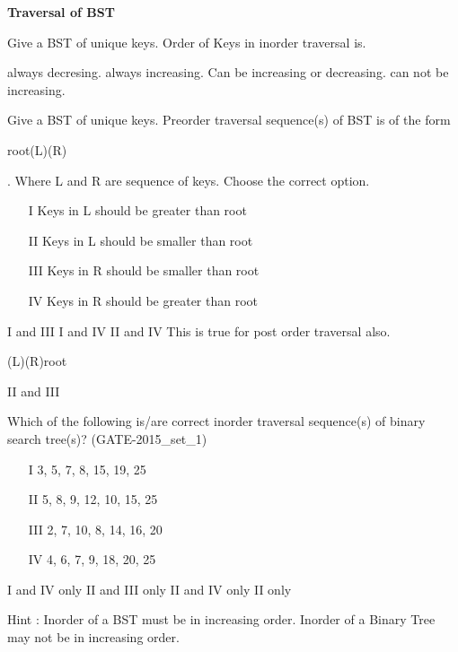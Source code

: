 

\centerline{\textbf{ \LARGE Traversal of BST}}

\begin{questyle}
  \question  Give a BST of unique keys. Order of Keys in inorder traversal is.
  \begin{choices}
    \choice         always decresing.
    \CorrectChoice  always increasing.
    \choice         Can be increasing or decreasing.
    \choice         can not be increasing.
  \end{choices}
\end{questyle}


\begin{questyle}
  \question  Give a BST of unique keys. Preorder traversal sequence(s) of BST is of the form
            \begin{hl} {root(L)(R)}\end{hl}. Where L and R are sequence of keys. Choose the correct option.
    \begin{enumerate}
        \item[I] Keys in L should be greater than root
        \item[II] Keys in L should be smaller than root
        \item[III] Keys in R should be smaller than root
        \item[IV] Keys in R should be greater than root
    \end{enumerate}

  \begin{choices}
    \choice         I and III
    \choice         I and IV
    \CorrectChoice  II and IV \qquad This is true for post order traversal also. \begin{hl} {(L)(R)root}\end{hl}
    \choice         II and III
  \end{choices}
\end{questyle}


\begin{questyle}
  \question  Which of the following is/are correct inorder traversal sequence(s) of binary search tree(s)?
            (GATE-2015\_set\_1)
    \begin{enumerate}
        \item[I] 3, 5, 7, 8, 15, 19, 25
        \item[II] 5, 8, 9, 12, 10, 15, 25
        \item[III] 2, 7, 10, 8, 14, 16, 20
        \item[IV] 4, 6, 7, 9, 18, 20, 25
    \end{enumerate}

  \begin{choices}
    \CorrectChoice  I and IV only
    \choice         II and III only
    \choice         II and IV only
    \choice         II only
  \end{choices}
  Hint : Inorder of a BST must be in increasing order. Inorder of a Binary Tree may not be in increasing order.
\end{questyle}


